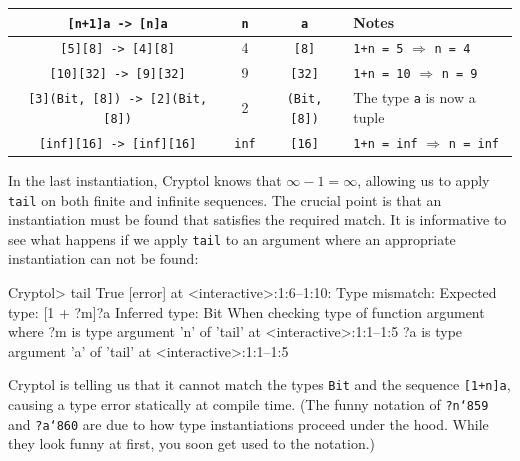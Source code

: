 
\begin{center}
\begin{tabular}[h]{c||c|c|l}
{\tt [n+1]a -> [n]a}                 & {\tt n}   & {\tt a}          & Notes \\ \hline\hline
{\tt [5][8] -> [4][8]}               &    4      & {\tt [8]}        & {\tt 1+n = 5} $\Rightarrow$ {\tt n = 4}  \\\hline
{\tt [10][32] -> [9][32]}            &    9      & {\tt [32]}       & {\tt 1+n = 10} $ \Rightarrow$ {\tt n = 9} \\\hline
{\tt [3](Bit, [8]) -> [2](Bit, [8])} &    2      & {\tt (Bit, [8])} & The type {\tt a} is now a tuple	           \\\hline
{\tt [inf][16] -> [inf][16]}         & {\tt inf} & {\tt [16]}       & {\tt 1+n = inf} $\Rightarrow$ {\tt n = inf}
\end{tabular}
\end{center}

In the last instantiation, Cryptol knows that $\infty - 1 = \infty$,
allowing us to apply {\tt tail} on both finite and infinite
sequences. The crucial point is that an instantiation must be found
that satisfies the required match.  It is informative to see what
happens if we apply {\tt tail} to an argument where an appropriate
instantiation can not be found:
\restartrepl
\begin{replPrompt}
  Cryptol> tail True
  [error] at <interactive>:1:6--1:10:
    Type mismatch:
      Expected type: [1 + ?m]?a
      Inferred type: Bit
      When checking type of function argument
    where
    ?m is type argument 'n' of 'tail' at <interactive>:1:1--1:5
    ?a is type argument 'a' of 'tail' at <interactive>:1:1--1:5
\end{replPrompt}
Cryptol is telling us that it cannot match the types \texttt{Bit} and
the sequence \texttt{[1+n]a}, causing a type error statically at
compile time. (The funny notation of \texttt{?n`859} and
\texttt{?a`860} are due to how type instantiations proceed under the
hood. While they look funny at first, you soon get used to the
notation.)

